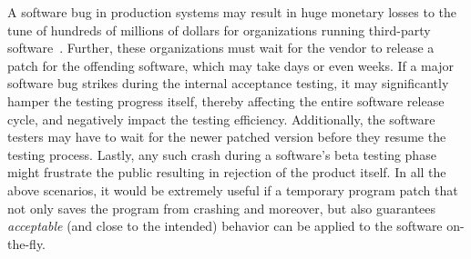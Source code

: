 

A software bug in production systems may result in huge monetary losses to the
tune of hundreds of millions of dollars for organizations running third-party
software~\cite{hp, amazon, hershey, nike}. Further, these organizations must
wait for the vendor to release a patch for the offending software, which may
take days or even weeks. If a major software bug strikes during the internal 
acceptance testing, it may significantly hamper the testing progress itself,
thereby affecting the entire software release cycle, and negatively impact the
testing efficiency. Additionally, the software testers may have to wait for the
newer patched version before they resume the testing process. Lastly, any such
crash during a software's beta testing phase might frustrate the public
resulting in rejection of the product itself. In all the above scenarios, it
would be extremely useful if a temporary program patch that not only saves the
program from crashing and moreover, but also guarantees \textit{acceptable} (and
close to the intended) behavior can be applied to the software on-the-fly.


